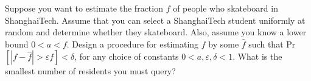 \problem{}

Suppose you want to estimate the fraction $f$ of people who skateboard in ShanghaiTech. Assume that you can select a ShanghaiTech student uniformly at random and determine whether they skateboard. Also, assume you know a lower bound $0 < a < f$. Design a procedure for estimating $f$ by some $\hat{f}$ such that Pr$[|f - \hat{f}| > \varepsilon f] < \delta$, for any choice of constants $0 < a, \varepsilon, \delta < 1$. What is the smallest number of residents you must query?

\solution{}

\newpage